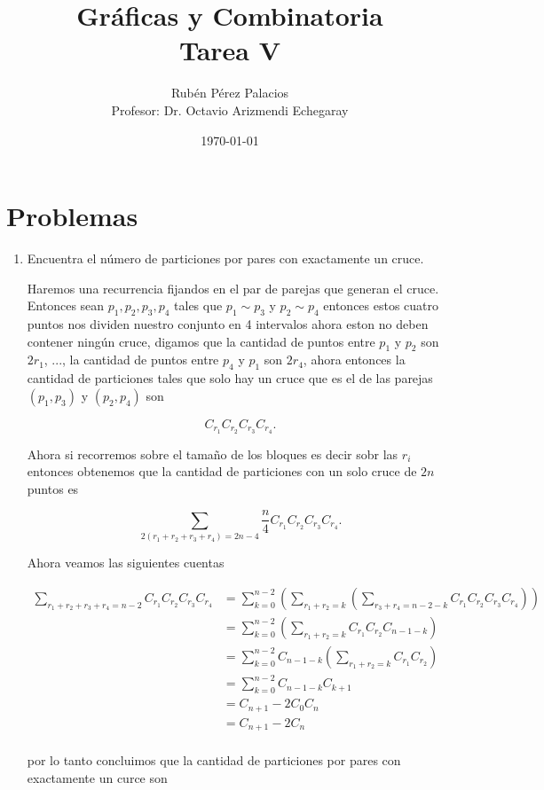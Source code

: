 \documentclass[letterpaper]{article}
\title{Gráficas y Combinatoria\\Tarea V}
\author{Rubén Pérez Palacios\\Profesor: Dr. Octavio Arizmendi Echegaray}
\date{\today}
\newcommand{\pars}[1]{\left( #1 \right) }
\newcommand{\1}{\mathbbm{1}}
\begin{document}
	\maketitle
    
    \section*{Problemas}

    \begin{enumerate}
		
		\item Encuentra el número de particiones por pares con exactamente un cruce.
		
		Haremos una recurrencia fijandos en el par de parejas que generan el cruce. Entonces sean $p_1,p_2,p_3,p_4$ tales que $p_1\sim p_3$ y $p_2\sim p_4$ entonces estos cuatro puntos nos dividen nuestro conjunto en 4 intervalos ahora eston no deben contener ningún cruce, digamos que la cantidad de puntos entre $p_1$ y $p_2$ son $2r_1$, ..., la cantidad de puntos entre $p_4$ y $p_1$ son $2r_4$, ahora entonces la cantidad de particiones tales que solo hay un cruce que es el de las parejas $(p_1,p_3)$ y $(p_2,p_4)$ son

		\[C_{r_1}C_{r_2}C_{r_3}C_{r_4}.\]

		Ahora si recorremos sobre el tamaño de los bloques es decir sobr las $r_i$ entonces obtenemos que la cantidad de particiones con un solo cruce de $2n$ puntos es

		\[\sum_{2(r_1+r_2+r_3+r_4) = 2n-4} \frac{n}{4} C_{r_1}C_{r_2}C_{r_3}C_{r_4}.\]

		Ahora veamos las siguientes cuentas

		\begin{align*}
			\sum_{r_1+r_2+r_3+r_4 = n-2} C_{r_1}C_{r_2}C_{r_3}C_{r_4} &= \sum_{k=0}^{n-2}\pars{\sum_{r_1+r_2 = k}\pars{ \sum_{r_3+r_4 = n-2-k} C_{r_1}C_{r_2}C_{r_3}C_{r_4}}}\\
			&= \sum_{k=0}^{n-2}\pars{\sum_{r_1+r_2 = k} C_{r_1}C_{r_2}C_{n-1-k}}\\
			&= \sum_{k=0}^{n-2} C_{n-1-k}\pars{\sum_{r_1+r_2 = k} C_{r_1}C_{r_2}}\\
			&= \sum_{k=0}^{n-2} C_{n-1-k}C_{k+1}\\
			&= C_{n+1} - 2C_0C_n\\
			&= C_{n+1} - 2C_n\\
		\end{align*}

		por lo tanto concluimos que la cantidad de particiones por pares con exactamente un curce son


\end{enumerate}
\end{document}
